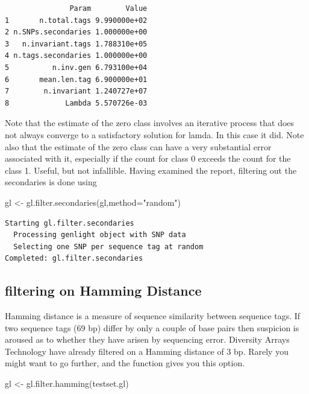 \documentclass[
  letterpaper,
  DIV=11,
  numbers=noendperiod]{scrreprt}
\newenvironment{Shaded}{\begin{snugshade}}{\end{snugshade}}
\newcommand{\AttributeTok}[1]{\textcolor[rgb]{0.49,0.56,0.16}{#1}}
\newcommand{\FunctionTok}[1]{\textcolor[rgb]{0.02,0.16,0.49}{#1}}
\newcommand{\NormalTok}[1]{\textcolor[rgb]{0.00,0.44,0.13}{#1}}
\newcommand{\OtherTok}[1]{\textcolor[rgb]{0.00,0.44,0.13}{#1}}
\newcommand{\StringTok}[1]{\textcolor[rgb]{0.25,0.44,0.63}{#1}}
\let\textttOrig\texttt
\renewcommand{\texttt}[1]{\textttOrig{\color{blue}{#1}}}
\begin{document}
\begin{verbatim}
               Param        Value
1       n.total.tags 9.990000e+02
2 n.SNPs.secondaries 1.000000e+00
3   n.invariant.tags 1.788310e+05
4 n.tags.secondaries 1.000000e+00
5          n.inv.gen 6.793100e+04
6       mean.len.tag 6.900000e+01
7        n.invariant 1.240727e+07
8             Lambda 5.570726e-03
\end{verbatim}

Note that the estimate of the zero class involves an iterative process
that does not always converge to a satisfactory solution for lamda. In
this case it did. Note also that the estimate of the zero class can have
a very substantial error associated with it, especially if the count for
class 0 exceeds the count for the class 1. Useful, but not infallible.
Having examined the report, filtering out the secondaries is done using

\begin{Shaded}
\begin{Highlighting}[]
\NormalTok{gl }\OtherTok{\textless{}{-}} \FunctionTok{gl.filter.secondaries}\NormalTok{(gl,}\AttributeTok{method=}\StringTok{"random"}\NormalTok{)}
\end{Highlighting}
\end{Shaded}

\begin{verbatim}
Starting gl.filter.secondaries 
  Processing genlight object with SNP data
  Selecting one SNP per sequence tag at random
Completed: gl.filter.secondaries 
\end{verbatim}

\hypertarget{filtering-on-hamming-distance}{%
\subsection{filtering on Hamming
Distance}\label{filtering-on-hamming-distance}}

Hamming distance is a measure of sequence similarity between sequence
tags. If two sequence tags (69 bp) differ by only a couple of base pairs
then suspicion is aroused as to whether they have arisen by sequencing
error. Diversity Arrays Technology have already filtered on a Hamming
distance of 3 bp. Rarely you might want to go further, and the
\texttt{gl.filter.hamming} function gives you this option.

\begin{Shaded}
\begin{Highlighting}[]
\NormalTok{gl }\OtherTok{\textless{}{-}} \FunctionTok{gl.filter.hamming}\NormalTok{(testset.gl)}
\end{Highlighting}
\end{Shaded}
\end{document}
